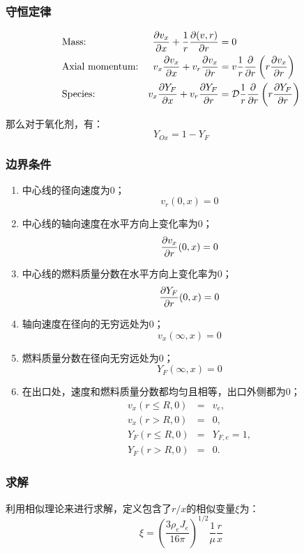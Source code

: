 \subsubsection{守恒定律}

\begin{equation}
    \begin{aligned}
        &\text{Mass:}&\frac{\partial v_x}{\partial x}+\frac{1}{r}\frac{\partial(v,r)}{\partial r}&=0\\
        &\text{Axial momentum:}& v_x \frac{\partial v_x}{\partial x}+ v_r\frac{\partial v_x}{\partial r} &= v\frac{1}{r}\frac{\partial}{\partial r}\left(r\frac{\partial v_x}{\partial r}\right)\\
        &\text{Species:}& v_x \frac{\partial Y_F}{\partial x} + v_r \frac{\partial Y_F}{\partial r}&=\mathcal{D}\frac{1}{r}\frac{\partial}{\partial r}\left(r\frac{\partial Y_F}{\partial r}\right)
    \end{aligned}
\end{equation}

那么对于氧化剂，有：
\begin{equation}
    Y_{Ox} = 1-Y_F
\end{equation}

\subsubsection{边界条件}
\begin{enumerate}
    \item 中心线的径向速度为0；
    \[v_r(0, x)=0\]
    \item 中心线的轴向速度在水平方向上变化率为0；
    \[\frac{\partial v_x}{\partial r}(0, x)=0\]
    \item 中心线的燃料质量分数在水平方向上变化率为0；
    \[\frac{\partial Y_F}{\partial r}(0, x)=0\]
    \item 轴向速度在径向的无穷远处为0；
    \[v_x(\infty, x)=0\]
    \item 燃料质量分数在径向无穷远处为0；
    \[Y_F(\infty, x) = 0\]
    \item 在出口处，速度和燃料质量分数都均匀且相等，出口外侧都为0；
    \[
        \begin{aligned}
            v_x(r\le R, 0) &=& v_e, \\
            v_x(r>R, 0) &=&0,\\
            Y_F(r\le R, 0)&=& Y_{F,e} = 1,\\
            Y_F(r>R, 0)&=&0.
        \end{aligned}
    \]
\end{enumerate}

\subsubsection{求解}
利用相似理论来进行求解，定义包含了\(r/x\)的相似变量\(\xi\)为：
\begin{equation}
    \xi = \left(\frac{3\rho_e J_e}{16\pi}\right)^{1/2}\frac{1}{\mu}\frac{r}{x}
\end{equation}

